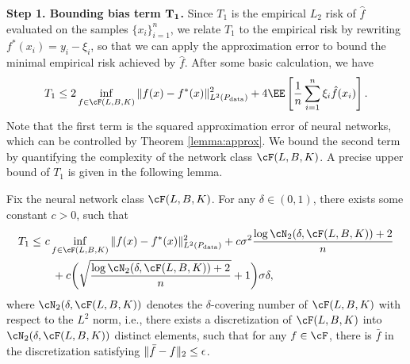 \textbf{Step 1. Bounding bias term $\bf{T_1}$.}
Since $T_1$ is the empirical $L_2$ risk of $\hat{f}$ evaluated on the samples $\{x_i\}_{i=1}^n$, we relate $T_1$ to the empirical risk by rewriting $f^*(x_i) = y_i - \xi_i$,  so that we can apply the approximation error to bound the minimal empirical risk achieved by $\hat{f}$. After some basic calculation, we have
\begin{align*}
T_1 %
 \leq  2 \inf_{f \in \cF( L, B, K)} \norm{ f(x) - f^*(x)}^2_{L^2(P_{\rm data})}  + 4 \EE \left[\frac{1}{n} \sum_{i=1}^n \xi_i \hat{f}(x_i) \right].
\end{align*}
Note that the first term is the squared approximation error of neural networks, which can be controlled by Theorem \ref{lemma:approx}. We bound the second term by quantifying the complexity of the network class $\cF( L, B, K)$. A precise upper bound of $T_1$ is given in the following lemma.
\begin{lemma}\label{lemma:t1}
Fix the neural network class $\cF( L, B, K)$. For any $\delta \in (0, 1)$, there exists some constant $c>0$, such that
\begin{align*}
T_1 \leq &~ c \inf_{f \in \cF( L, B, K)} \norm{ f(x) - f^*(x)}^2_{L^2(P_{\rm data})} + c \sigma^2 \frac{\log \cN_2(\delta, \cF( L, B, K)) + 2}{n} \\
&\quad+  c\bigg(   \sqrt{\frac{\log \cN_2(\delta, \cF(L, B, K)) + 2}{n}} + 1 \bigg)\sigma \delta,
\end{align*}
where $\cN_2(\delta, \cF(L, B, K))$ denotes the $\delta$-covering number of $\cF(L, B, K)$ with respect to the $L^2$ norm, i.e., there exists a discretization of $\cF(L, B, K)$ into $\cN_2(\delta, \cF(L, B, K))$ distinct elements, such that for any $f \in \cF$, there is $\bar{f}$ in the discretization satisfying $\|\bar{f} - f\|_2 \leq \epsilon$.
\end{lemma}

